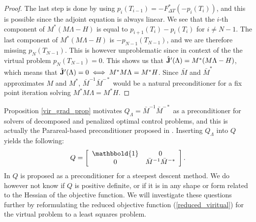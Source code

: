 \documentclass[11pt,a4paper]{article}
\begin{document}
\begin{proof}
The last step is done by using $p_i(T_{i-1})=-F_{\Delta T}^*(-p_i(T_i))$, and this is possible since the adjoint equation is always linear. We see that the $i$-th component of $M^* (M \Lambda-H)$ is equal to $p_{i+1}(T_i)-p_{i}(T_i)$ for $i\neq N-1$. The last component of $M^* (M \Lambda-H)$ is $-p_{N-1}(T_{N-1})$, and we are therefore missing $p_N(T_{N-1})$. This is however unproblematic since in context of the the virtual problem $p_N(T_{N-1})=0$. This shows us that $\hat{\bold J}'(\Lambda)= M^* (M \Lambda-H)$, which means that $\hat{\bold J}'(\Lambda)=0 \iff M^*M\Lambda =M^*H$. Since $\bar M$ and $\bar M^*$ approximates $M$ and $M^*$, $\bar{M}^{-1}\bar M^{-*}$ would be a natural preconditioner for a fix point iteration solving $M^*M\Lambda =M^*H$. 
\end{proof}
Proposition \ref{vir_grad_prop} motivates $Q_{\Lambda}=\bar{M}^{-1}\bar M^{-*}$ as a preconditioner for solvers of decomposed and penalized optimal control problems, and this is actually the Parareal-based preconditioner proposed in \cite{maday2002parareal}. Inserting $Q_{\Lambda}$ into $Q$ yields the following:
\begin{align}
Q = \left[ \begin{array}{cc}
	\mathbbold{1} & 0 \\
	0 &  \bar{M}^{-1}\bar{M}^{-*}\\
	\end{array} \right]. \label{Q_PC}
\end{align}  
In \cite{maday2002parareal} $Q$ is proposed as a preconditioner for a steepest descent method. We do however not know if $Q$ is positive definite, or if it is in any shape or form related to the Hessian of the objective function. We will investigate these questions further by reformulating the reduced objective function (\ref{reduced_viritual}) for the virtual problem to a least squares problem.
\end{document}
